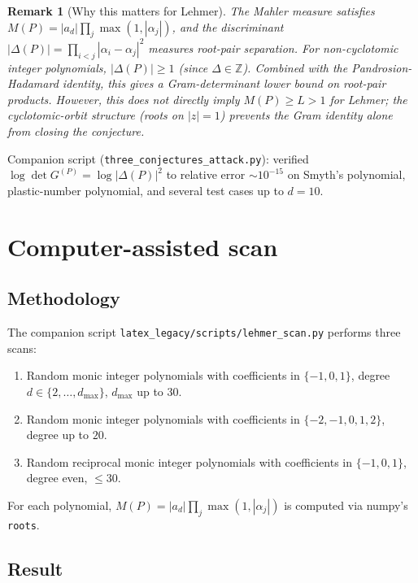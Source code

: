 \documentclass[11pt,a4paper]{article}
\newtheorem{remark}[theorem]{Remark}
\begin{document}
\begin{remark}[Why this matters for Lehmer]
The Mahler measure satisfies $M(P) = |a_d| \prod_j \max(1, |\alpha_j|)$, and the discriminant
$|\Delta(P)| = \prod_{i<j} |\alpha_i - \alpha_j|^2$ measures root-pair separation.
For non-cyclotomic integer polynomials, $|\Delta(P)| \ge 1$ (since $\Delta \in \mathbb{Z}$).
Combined with the Pandrosion-Hadamard identity, this gives a Gram-determinant lower
bound on root-pair products. However, this does \emph{not} directly imply
$M(P) \ge L > 1$ for Lehmer; the cyclotomic-orbit structure (roots on $|z| = 1$)
prevents the Gram identity alone from closing the conjecture.
\end{remark}

Companion script (\texttt{three\_conjectures\_attack.py}): verified
$\log\det G^{(P)} = \log|\Delta(P)|^2$ to relative error $\sim 10^{-15}$ on
Smyth's polynomial, plastic-number polynomial, and several test cases up to $d = 10$.

\section{Computer-assisted scan}\label{sec:scan}

\subsection{Methodology}

The companion script \verb|latex_legacy/scripts/lehmer_scan.py| performs three scans:
\begin{enumerate}
\item Random monic integer polynomials with coefficients in $\{-1, 0, 1\}$, degree $d \in \{2, \dots, d_{\max}\}$, $d_{\max}$ up to $30$.
\item Random monic integer polynomials with coefficients in $\{-2, -1, 0, 1, 2\}$, degree up to $20$.
\item Random reciprocal monic integer polynomials with coefficients in $\{-1, 0, 1\}$, degree even, $\le 30$.
\end{enumerate}
For each polynomial, $M(P) = |a_d| \prod_j \max(1, |\alpha_j|)$ is computed via numpy's \verb|roots|.

\subsection{Result}
\end{document}
